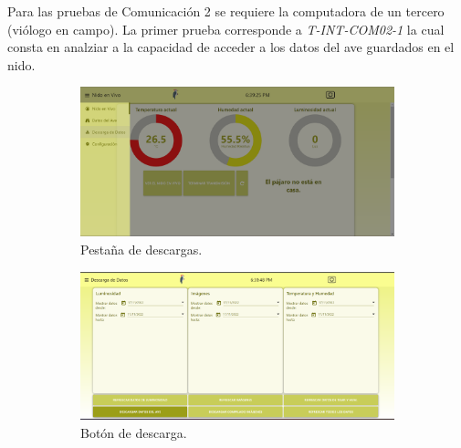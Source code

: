 
Para las pruebas de Comunicación 2 se requiere la computadora de un tercero (viólogo en campo). La primer prueba corresponde a \textit{T-INT-COM02-1} la cual consta en analziar a la capacidad de acceder a los datos del ave guardados en el nido.
\begin{figure}[H]
\centering
	\begin{subfigure}{0.49\textwidth}
		\centering
		\includegraphics[width=\linewidth]{ImagenesValidacion del prototipo/TINTCOM21a}		
		\caption{Pestaña de descargas.}
	\end{subfigure}\hfill
	\begin{subfigure}{0.49\textwidth}
		\centering
		\includegraphics[width=\linewidth]{ImagenesValidacion del prototipo/TINTCOM21b}
		\caption{Botón de descarga.}
	\end{subfigure}
	\caption*{}
\end{figure}
